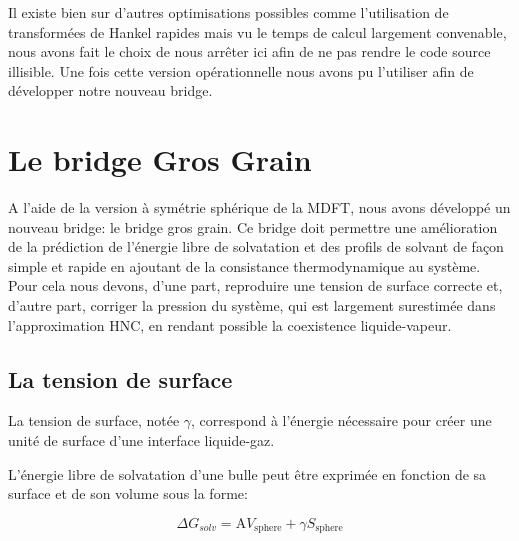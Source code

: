 Il existe bien sur d'autres optimisations possibles comme l'utilisation de transformées de Hankel rapides mais vu le temps de calcul largement convenable, nous avons fait le choix de nous arrêter ici afin de ne pas rendre le code source illisible. Une fois cette version opérationnelle nous avons pu l'utiliser afin de développer notre nouveau bridge.



\section{Le bridge Gros Grain}
A l'aide de la version à symétrie sphérique de la MDFT, nous avons développé un nouveau bridge: le bridge gros grain. Ce bridge doit permettre une amélioration de la prédiction de l'énergie libre de solvatation et des profils de solvant de façon simple et rapide en ajoutant de la consistance thermodynamique au système. Pour cela nous devons, d'une part, reproduire une tension de surface correcte et, d'autre part, corriger la pression du système, qui est largement surestimée dans l'approximation HNC, en rendant possible la coexistence liquide-vapeur. 

\subsection{La tension de surface}
La tension de surface, notée $\gamma$, correspond à l'énergie nécessaire pour créer une unité de surface d'une interface liquide-gaz.

L'énergie libre de solvatation d'une bulle peut être exprimée en fonction de sa surface et de son volume sous la forme:

\begin{equation} \label{eq:energie_libre_terme_volume_surface}
\Delta G_{solv}= \mathrm{A} V_{\mathrm{sphere}} + \gamma S_{\mathrm{sphere}} 
\end{equation}

